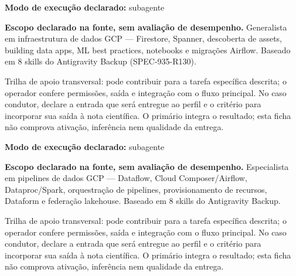 \begin{arquitetura}
\textbf{Modo de execução declarado:} subagente
\end{arquitetura}


\begin{descricao}
\textbf{Escopo declarado na fonte, sem avaliação de desempenho.}
Generalista em infraestrutura de dados GCP — Firestore, Spanner, descoberta de assets, building data apps, ML best practices, notebooks e migrações Airflow. Baseado em 8 skills do Antigravity Backup (SPEC-935-R130).
\end{descricao}

\begin{funcao}
Trilha de apoio transversal: pode contribuir para a tarefa específica descrita; o operador confere permissões, saída e integração com o fluxo principal. No caso condutor, declare a entrada que será entregue ao perfil e o critério para incorporar sua saída à nota científica. O primário integra o resultado; esta ficha não comprova ativação, inferência nem qualidade da entrega.
\end{funcao}

\begin{arquitetura}
\textbf{Modo de execução declarado:} subagente
\end{arquitetura}


\begin{descricao}
\textbf{Escopo declarado na fonte, sem avaliação de desempenho.}
Especialista em pipelines de dados GCP — Dataflow, Cloud Composer/Airflow, Dataproc/Spark, orquestração de pipelines, provisionamento de recursos, Dataform e federação lakehouse. Baseado em 8 skills do Antigravity Backup.
\end{descricao}

\begin{funcao}
Trilha de apoio transversal: pode contribuir para a tarefa específica descrita; o operador confere permissões, saída e integração com o fluxo principal. No caso condutor, declare a entrada que será entregue ao perfil e o critério para incorporar sua saída à nota científica. O primário integra o resultado; esta ficha não comprova ativação, inferência nem qualidade da entrega.
\end{funcao}


